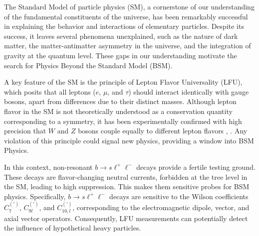 The Standard Model of particle physics (SM), a cornerstone of our 
understanding of the fundamental constituents of the universe, 
has been remarkably successful in explaining the behavior 
and interactions of elementary particles. Despite its success, 
it leaves several phenomena unexplained, such as the 
nature of dark matter, the matter-antimatter asymmetry in the 
universe, and the integration of gravity at the quantum level. 
These gaps in our understanding motivate the search for Physics 
Beyond the Standard Model (BSM).\cite{SM_BSM}

A key feature of the SM is the principle of Lepton 
Flavor Universality (LFU), which posits that all leptons ($e$, 
$\mu$, and $\tau$) should interact identically with gauge bosons, 
apart from differences due to their distinct masses. Although 
lepton flavor in the SM is not theoretically understood 
as a conservation quantity corresponding to a symmetry, it has 
been experimentally confirmed with high precision that $W$ and $Z$ 
bosons couple equally to different lepton flavors \cite{LU_CDF}, 
\cite{LU_ATLAS}. Any violation of this principle could signal new 
physics, providing a window into BSM Physics.

In this context, non-resonant $b\to s\ell^+\ell^-$ decays provide a fertile 
testing ground. These decays are flavor-changing neutral currents, 
forbidden at the tree level in the SM, leading to high suppression. 
This makes them sensitive probes for BSM physics. Specifically, 
$b\to s\ell^+\ell^-$ decays are sensitive to the Wilson coefficients 
$C_7^{\scriptscriptstyle (')}$, $C_{9l}^{\scriptscriptstyle (')}$, and 
$C_{10,l}^{\scriptscriptstyle (')}$, corresponding to the electromagnetic 
dipole, vector, and axial vector operators. 
Consequently, LFU measurements can potentially detect the influence 
of hypothetical heavy particles.

